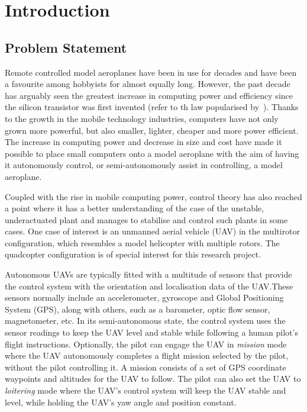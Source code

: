 \chapter{Introduction}
\label{chap1}

\section{Problem Statement}
\label{sec:problem-statement}

Remote controlled model aeroplanes have been in use for decades and have been a favourite among hobbyists for almost equally long. However, the past decade has arguably seen the greatest increase in computing power and efficiency since the silicon transistor was first invented (refer to th law popularised by~\cite{moore2005cramming}). Thanks to the growth in the mobile technology industries, computers have not only grown more powerful, but also smaller, lighter, cheaper and more power efficient. The increase in computing power and decrease in size and cost have made it possible to place small computers onto a model aeroplane with the aim of having it autonomously control, or semi-autonomously assist in controlling, a model aeroplane. 

Coupled with the rise in mobile computing power, control theory has also reached a point where it has a better understanding of the case of the unstable, underactuated plant and manages to stabilise and control such plants in some cases. One case of interest is an unmanned aerial vehicle (UAV) in the multirotor configuration, which resembles a model helicopter with multiple rotors. The quadcopter configuration is of special interest for this research project.  

Autonomous UAVs are typically fitted with a multitude of sensors that provide the control system with the orientation and localisation data of the UAV.\@ These sensors normally include an accelerometer, gyroscope and Global Positioning System (GPS), along with others, such as a barometer, optic flow sensor, magnetometer, etc. In its semi-autonomous state, the control system uses the sensor readings to keep the UAV level and stable while following a human pilot's flight instructions. Optionally, the pilot can engage the UAV in \emph{mission} mode where the UAV autonomously completes a flight mission selected by the pilot, without the pilot controlling it. A mission consists of a set of GPS coordinate waypoints and altitudes for the UAV to follow. The pilot can also set the UAV to \emph{loitering} mode where the UAV's control system will keep the UAV stable and level, while holding the UAV's yaw angle and position constant. 

